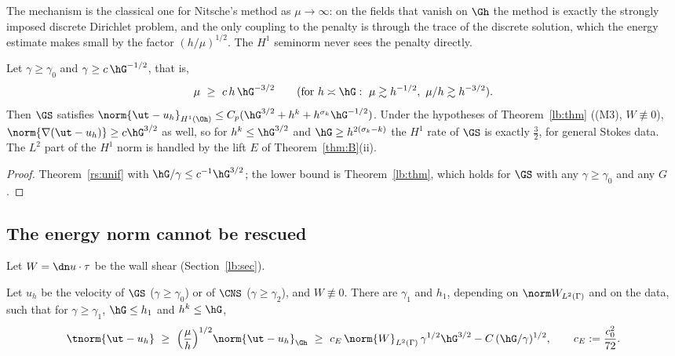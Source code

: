 The mechanism is the classical one for Nitsche's method as $\mu\to\infty$: on the fields that vanish on $\Gh$ the method is exactly the strongly imposed discrete Dirichlet problem, and the only coupling to the penalty is through the trace of the discrete solution, which the energy estimate makes small by the factor $(h/\mu)^{1/2}$. The $H^1$ seminorm never sees the penalty directly.

\begin{corollary}\label{rs:rescue}
Let $\gamma\ge\gamma_0$ and $\gamma\ge c\,\hG^{-1/2}$, that is,
\[
\mu\ \ge\ c\,h\,\hG^{-3/2}\qquad(\text{for }h\asymp\hG:\ \mu\gtrsim h^{-1/2},\ \mu/h\gtrsim h^{-3/2}).
\]
Then $\GS$ satisfies $\norm{\ut-u_h}_{H^1(\Oh)}\le C_p(\hG^{3/2}+h^k+h^{\sigma_k}\hG^{-1/2})$. Under the hypotheses of Theorem~\ref{lb:thm} ((M3), $W\not\equiv0$), $\norm{\nabla(\ut-u_h)}\ge c\hG^{3/2}$ as well, so for $h^k\le\hG^{3/2}$ and $\hG\ge h^{2(\sigma_k-k)}$ the $H^1$ rate of $\GS$ is exactly $\frac32$, for general Stokes data. The $L^2$ part of the $H^1$ norm is handled by the lift $E$ of Theorem~\ref{thm:B}(ii).
\end{corollary}

\begin{proof}
Theorem~\ref{rs:unif} with $\hG/\gamma\le c^{-1}\hG^{3/2}$; the lower bound is Theorem~\ref{lb:thm}, which holds for $\GS$ with any $\gamma\ge\gamma_0$ and any $G$.
\end{proof}

\subsection{The energy norm cannot be rescued}

Let $W=\dn u\cdot\tau$ be the wall shear (Section~\ref{lb:sec}).

\begin{theorem}\label{rs:elower}
Let $u_h$ be the velocity of $\GS$ ($\gamma\ge\gamma_0$) or of $\CNS$ ($\gamma\ge\gamma_2$), and $W\not\equiv0$. There are $\gamma_1$ and $h_1$, depending on $\norm W_{L^2(\Gamma)}$ and on the data, such that for $\gamma\ge\gamma_1$, $\hG\le h_1$ and $h^k\le\hG$,
\[
\tnorm{\ut-u_h}\ \ge\ \Bigl(\frac\mu h\Bigr)^{1/2}\norm{\ut-u_h}_{\Gh}\ \ge\ c_E\,\norm{W}_{L^2(\Gamma)}\,\gamma^{1/2}\hG^{3/2}-C\,(\hG/\gamma)^{1/2},\qquad c_E:=\frac{c_0^2}{72}.
\]
\end{theorem}


